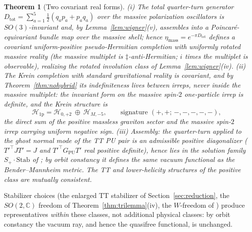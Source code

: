 \documentclass[11pt]{article}
\newtheorem{theorem}{Theorem}[section]
\theoremstyle{definition}
\theoremstyle{remark}
\newcommand{\C}{\mathbb{C}}
\newcommand{\dd}{\ddagger}
\begin{document}
\begin{theorem}[Two covariant real forms]\label{thm:tworeal}
(i) The total quarter-turn generator
$D_{\mathrm{tot}}=\sum_{a=1}^{5}\tfrac12(q_ap_a+p_aq_a)$ over the massive
polarization oscillators is $SO(3)$-invariant and, by
Lemma~\ref{lem:wigner}(v), assembles into a Poincar\'e-equivariant bundle
map over the massive shell; hence
$\eta_{\mathrm{mass}}=e^{-\pi D_{\mathrm{tot}}}$ defines a covariant
uniform-positive pseudo-Hermitian completion with uniformly rotated
massive reality (the massive multiplet is $\dd$-anti-Hermitian; $i$ times
the multiplet is observable), realizing the rotated involution class of
Lemma~\ref{lem:wigner}(iv).  (ii) The Krein completion with standard
gravitational reality is covariant, and by Theorem~\ref{thm:nohybrid} its
indefiniteness lives \emph{between} irreps, never inside the massive
multiplet: the invariant form on the massive spin-$2$ one-particle irrep
is definite, and the Krein structure is
\begin{equation}
\mathcal H_{\mathrm{1p}}
=\mathcal H_{0,+2}\ \oplus\ \mathcal H_{M,-5},
\qquad\text{signature } (+,+;\,-,-,-,-,-),
\end{equation}
the direct sum of the positive massless graviton sector and the massive
spin-$2$ irrep carrying uniform negative sign.  (iii) Assembly: the
quarter-turn applied to the ghost normal
mode of the TT PU pair is an admissible positive diagonalizer
($T'^{\top}JT'=J$ and $T'^{\top}G_{\mathrm{PU}}T'$ real positive
definite), hence lies in the solution family $S_+\cdot\mathrm{Stab}$ of
\cite{companion1}; by orbit constancy \cite{companion3} it defines the
same vacuum functional as the Bender--Mannheim metric.  The TT and
lower-helicity structures of the positive class are mutually consistent.
\end{theorem}

Stabilizer choices (the enlarged TT stabilizer of
Section~\ref{sec:reduction}, the $SO(2,\C)$ freedom of
Theorem~\ref{thm:trilemma}(iv), the $W$-freedom of \cite{companion1})
produce representatives \emph{within} these classes, not additional
physical classes: by orbit constancy the vacuum ray, and hence the
quasifree functional, is unchanged.
\end{document}
